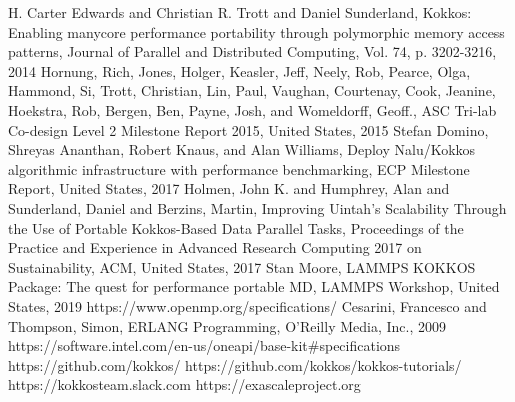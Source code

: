 \documentclass[conference]{IEEEtran}
\begin{document}
\begin{thebibliography}{00}
 H. Carter Edwards and Christian R. Trott and Daniel Sunderland, 
Kokkos: Enabling manycore performance portability through polymorphic memory access patterns, Journal of Parallel and Distributed Computing, Vol. 74, p. 3202-3216, 2014
 Hornung, Rich, Jones, Holger, Keasler, Jeff, Neely, Rob, Pearce, Olga, Hammond, Si, Trott, Christian, Lin, Paul, Vaughan, Courtenay, Cook, Jeanine, Hoekstra, Rob, Bergen, Ben, Payne, Josh, and Womeldorff, Geoff., ASC Tri-lab Co-design Level 2 Milestone Report 2015, United States, 2015
 Stefan Domino, Shreyas Ananthan, Robert Knaus, and Alan Williams, 
Deploy Nalu/Kokkos algorithmic infrastructure with performance benchmarking, ECP Milestone Report, United States, 2017
 Holmen, John K. and Humphrey, Alan and Sunderland, Daniel and Berzins, Martin, Improving Uintah’s Scalability Through the Use of Portable Kokkos-Based Data Parallel Tasks, Proceedings of the Practice and Experience in Advanced Research Computing 2017 on Sustainability, ACM, United States, 2017
 Stan Moore, LAMMPS KOKKOS Package: The quest for performance portable MD, LAMMPS Workshop, United States, 2019
 https://www.openmp.org/specifications/
 Cesarini, Francesco and Thompson, Simon, ERLANG Programming, O’Reilly Media, Inc., 2009
 https://software.intel.com/en-us/oneapi/base-kit\#specifications
 https://github.com/kokkos/
 https://github.com/kokkos/kokkos-tutorials/
 https://kokkosteam.slack.com
 https://exascaleproject.org
\end{thebibliography}
\end{document}
